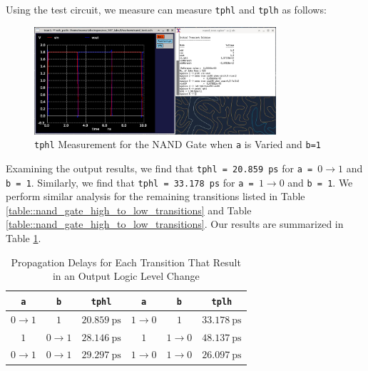 \documentclass[fleqn]{article}
\begin{document}
	\noindent Using the test circuit, we measure can measure \texttt{tphl} and \texttt{tplh} as follows:
	
	\begin{figure}[H]
		\centerline{\includegraphics[width=0.8\textwidth]{nand_delay_sweep_va.png}}
		\caption{\texttt{tphl} Measurement for the NAND Gate when \texttt{a} is Varied and \texttt{b=1}}
		\label{fig::nand_delay_sweep_va}
	\end{figure}
	
	Examining the output results, we find that \texttt{tphl = 20.859 ps} for \texttt{a = }$0 \rightarrow 1$ and \texttt{b = 1}. Similarly, we find that \texttt{tphl = 33.178 ps} for \texttt{a = }$1 \rightarrow 0$ and \texttt{b = 1}. We perform similar analysis for the remaining transitions listed in Table \ref{table::nand_gate_high_to_low_transitions} and Table \ref{table::nand_gate_high_to_low_transitions}. Our results are summarized in Table \ref{table::nand_gate_delay_analysis}.
	
	\begin{table}[H]
	\begin{center}
	\caption{Propagation Delays for Each Transition That Result in an Output Logic Level Change}
	\label{table::nand_gate_delay_analysis}
	\begin{tabular}{| c | c | c || c | c | c |}
		\hline
		\texttt{a} & \texttt{b} & \texttt{tphl} & \texttt{a} & \texttt{b} & \texttt{tplh} \\
		\hline	
		$0 \rightarrow 1$ & $1$ & $20.859\ \text{ps}$ & $1 \rightarrow 0$ & $1$ & $33.178\ \text{ps}$\\
		\hline	
		$1$ & $0 \rightarrow 1$ & $28.146\ \text{ps}$ & $1$ & $1 \rightarrow 0$ & $48.137\ \text{ps}$\\
		\hline	
		$0 \rightarrow 1$ & $0 \rightarrow 1$ & $29.297\ \text{ps}$ & $1 \rightarrow 0$ & $1 \rightarrow 0$ & $26.097\ \text{ps}$\\
		\hline
	\end{tabular}
	\end{center}
	\end{table}
	
\end{document}
